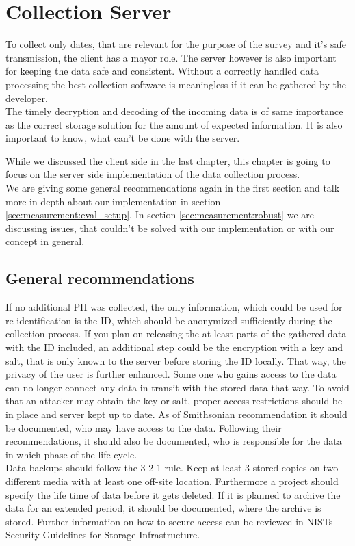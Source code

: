 \chapter{Collection Server}
\label{chap:mmeasurement}
To collect only dates, that are relevant for the purpose of the survey and it's safe transmission, the client has a mayor role. The server however is also important for keeping the data safe and consistent. Without a correctly handled data processing the best collection software is meaningless if it can be gathered by the developer.\\
The timely decryption and decoding of the incoming data is of same importance as the correct storage solution for the amount of expected information. It is also important to know, what can't be done with the server.

While we discussed the client side in the last chapter, this chapter is going to focus on
the server side implementation of the data collection process.\\
We are giving some general recommendations again in the first section and talk more in depth about our implementation in section \ref{sec:measurement:eval_setup}.
In section \ref{sec:measurement:robust} we are discussing issues, that couldn't be solved with our implementation or with our concept in general.
%


\section{General recommendations}
\label{sec:measurement:limits}
%
If no additional PII was collected, the only information, which could be used for re-identification is the ID, which should be anonymized sufficiently during the collection process. If you plan on releasing the at least parts of the gathered data with the ID included, an additional step could be the encryption with a key and salt, that is only known to the server before storing the ID locally. That way, the privacy of the user is further enhanced. Some one who gains access to the data can no longer connect any data in transit with the stored data that way.
To avoid that an attacker may obtain the key or salt, proper access restrictions should be in place and server kept up to date. As of Smithsonian recommendation it should be documented, who may have access to the data\cite{noauthor_best_2018}. Following their recommendations, it should also be documented, who is responsible for the data in which phase of the life-cycle.\\
Data backups should follow the 3-2-1 rule. Keep at least 3 stored copies on two different media with at least one off-site location. Furthermore a project should specify the life time of data before it gets deleted. If it is planned to archive the data for an extended period, it should be documented, where the archive is stored\cite{noauthor_best_2018}.
Further information on how to secure access can be reviewed in NISTs Security Guidelines for Storage Infrastructure\cite{chandramouli_security_2020}. 
 

